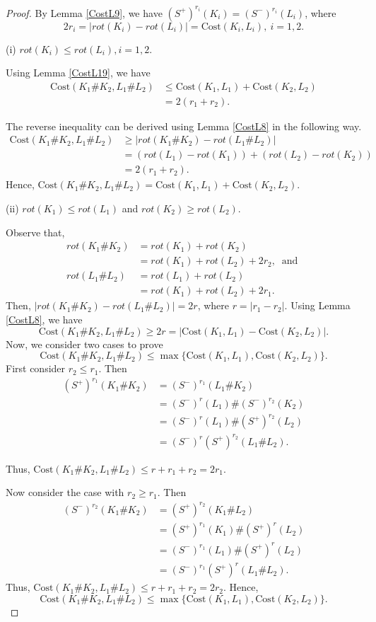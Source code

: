 \documentclass[11pt]{amsart}
\numberwithin{equation}{section}
\theoremstyle{plain}
\theoremstyle{definition}
\theoremstyle{remark} \newtheorem{remark}[equation]{Remark}
\theoremstyle{remark} \newtheorem{observation}[equation]{Observation}
\newcommand{\Cost}{\text{Cost}}
\begin{document}
\begin{proof}

By Lemma \ref{CostL9}, we have $(S^+)^{r_i}(K_i)=(S^-)^{r_i}(L_i)$, where $$2r_i=|rot(K_i)-rot(L_i)|=\Cost(K_i,L_i),\:i=1,2.$$  

 \noindent(i)  $rot(K_i)\leq rot(L_i),i=1,2$.
    
Using Lemma \ref{CostL19}, we have
\begin{align*}
    \Cost(K_1\#K_2,L_1\#L_2)&\leq \Cost(K_1,L_1)+\Cost(K_2,L_2)\\
    &=2(r_1+r_2).
\end{align*}

The reverse inequality can be derived using Lemma \ref{CostL8} in the following way.
\begin{align*}
    \Cost(K_1\#K_2,L_1\#L_2)&\geq |rot(K_1\#K_2)-rot(L_1\#L_2)|\\
    &=(rot(L_1)-rot(K_1))+(rot(L_2)-rot(K_2))\\
    &=2(r_1+r_2). 
\end{align*}
Hence, $ \Cost(K_1\#K_2,L_1\#L_2)=\Cost(K_1,L_1)+\Cost(K_2,L_2)$.

   \noindent (ii) $rot(K_1)\leq rot(L_1)$ and $rot(K_2)\geq rot(L_2)$.

    Observe that,
    \begin{align*}
        rot(K_1\#K_2)&=rot(K_1)+rot(K_2)\\
        &=rot(K_1)+rot(L_2)+2r_2,\: \text{ and }\\
        rot(L_1\#L_2)&=rot(L_1)+rot(L_2)\\
       & =rot(K_1)+rot(L_2)+2r_1.
    \end{align*}
    Then, $|rot(K_1\#K_2)-rot(L_1\#L_2)|=2r$, where $r=|r_1-r_2|$. Using Lemma \ref{CostL8}, we have
   $$\Cost(K_1\#K_2,L_1\#L_2)\geq 2r=|\Cost(K_1,L_1)-\Cost(K_2,L_2)|.$$ 
   Now, we consider two cases to prove 
     $$\Cost(K_1\#K_2,L_1\#L_2)\leq \max\{\Cost(K_1,L_1),\Cost(K_2,L_2)\}.$$ 
     First consider $r_2\leq r_1$. Then
 \begin{align*}
       (S^+)^{r_1}(K_1\#K_2)&=(S^-)^{r_1}(L_1\#K_2)\\
       &=(S^-)^{r}(L_1)\#(S^-)^{r_2}(K_2)\\
       &=(S^-)^{r}(L_1)\#(S^+)^{r_2}(L_2)\\
       &=(S^-)^{r}(S^+)^{r_2}(L_1\#L_2).
   \end{align*}
       
     Thus, $\Cost(K_1\#K_2,L_1\#L_2)\leq r+r_1+r_2=2r_1.$

    Now consider the case with $r_2\geq r_1$. Then
    \begin{align*}
        (S^-)^{r_2}(K_1\#K_2)&=(S^+)^{r_2}(K_1\#L_2)\\
        &=(S^+)^{r_1}(K_1)\#(S^+)^{r}(L_2)\\
        &=(S^-)^{r_1}(L_1)\#(S^+)^{r}(L_2)\\
        &=(S^-)^{r_1}(S^+)^{r}(L_1\#L_2).
    \end{align*}
     Thus, $\Cost(K_1\#K_2,L_1\#L_2)\leq r+r_1+r_2=2r_2.$ Hence,
     $$\Cost(K_1\#K_2,L_1\#L_2)\leq \max\{\Cost(K_1,L_1),\Cost(K_2,L_2)\}.$$
     
   \end{proof}
\end{document}
